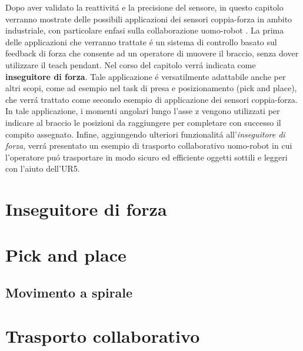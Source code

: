 Dopo aver validato la reattivit\'{a} e la precisione del sensore, in questo capitolo verranno mostrate delle possibili applicazioni 
dei sensori coppia-forza in ambito industriale, con particolare enfasi sulla collaborazione uomo-robot \cite{applications}. 
La prima delle applicazioni che verranno trattate \'{e} un sistema di controllo basato sul feedback di forza che consente ad un 
operatore di muovere il braccio, senza dover utilizzare 
il teach pendant. Nel corso del capitolo verr\'{a} indicata come \textbf{inseguitore di forza}. Tale applicazione \'{e} versatilmente 
adattabile anche per altri scopi, come ad esempio nel task di presa e posizionamento (pick and place), che verr\'{a} trattato come 
secondo esempio di applicazione dei sensori coppia-forza. In tale applicazione, i momenti angolari lungo l'asse z vengono 
utilizzati per indicare al braccio le posizioni da raggiungere per completare con successo il compito assegnato. 
Infine, aggiungendo ulteriori funzionalit\'{a} all'\textit{inseguitore di forza}, verr\'{a} presentato un esempio di trasporto 
collaborativo uomo-robot in cui l'operatore pu\'{o} trasportare in modo sicuro ed efficiente oggetti sottili e leggeri con l'aiuto 
dell'UR5.

\section{Inseguitore di forza} \label{sec:force_follower}


\section{Pick and place} \label{sec:pick_place}


\subsection{Movimento a spirale}


\section{Trasporto collaborativo}
